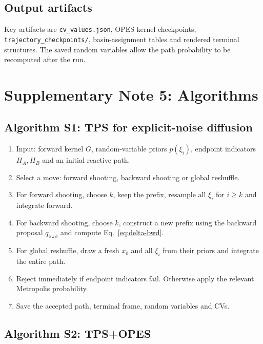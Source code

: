 \documentclass[11pt,a4paper]{article}
\begin{document}
\subsection{Output artifacts}

Key artifacts are \texttt{cv\_values.json}, OPES kernel checkpoints,
\texttt{trajectory\_checkpoints/}, basin-assignment tables and rendered
terminal structures. The saved random variables allow the path probability to
be recomputed after the run.

\section{Supplementary Note 5: Algorithms}
\label{sec:algorithms}

\subsection*{Algorithm S1: TPS for explicit-noise diffusion}

\begin{enumerate}[leftmargin=*]
  \item Input: forward kernel $G$, random-variable priors
  $p(\xi_i)$, endpoint indicators $H_A,H_B$ and an initial reactive path.
  \item Select a move: forward shooting, backward shooting or global reshuffle.
  \item For forward shooting, choose $k$, keep the prefix, resample all
  $\xi_i$ for $i\ge k$ and integrate forward.
  \item For backward shooting, choose $k$, construct a new prefix using the
  backward proposal $q_{\mathrm{bwd}}$ and compute
  Eq.~\eqref{eq:delta-bwd}.
  \item For global reshuffle, draw a fresh $x_0$ and all $\xi_i$ from their
  priors and integrate the entire path.
  \item Reject immediately if endpoint indicators fail. Otherwise apply the
  relevant Metropolis probability.
  \item Save the accepted path, terminal frame, random variables and CVs.
\end{enumerate}

\subsection*{Algorithm S2: TPS+OPES}
\end{document}
